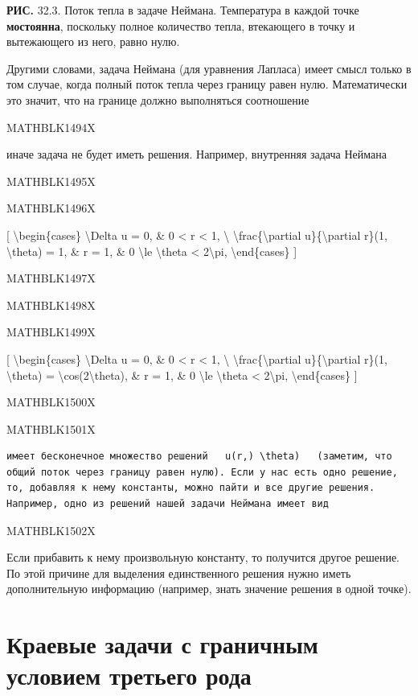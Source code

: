 \documentclass[
]{article}
\begin{document}
\textbf{РИС.} 32.3. Поток тепла в задаче Неймана. Температура в каждой
точке \textbf{мостоянна}, поскольку полное количество тепла, втекающего
в точку и вытежающего из него, равно нулю.

Другими словами, задача Неймана (для уравнения Лапласа) имеет смысл
только в том случае, когда полный поток тепла через границу равен нулю.
Математически это значит, что на границе должно выполняться соотношение

MATHBLK1494X

иначе задача не будет иметь решения. Например, внутренняя задача Неймана

MATHBLK1495X

MATHBLK1496X

{[} \textbackslash begin\{cases\} \textbackslash Delta u = 0, \& 0
\textless{} r \textless{} 1, \textbackslash{}
\textbackslash frac\{\textbackslash partial u\}\{\textbackslash partial
r\}(1, \textbackslash theta) = 1, \& r = 1, \& 0 \textbackslash le
\textbackslash theta \textless{} 2\textbackslash pi,
\textbackslash end\{cases\} {]}

MATHBLK1497X

MATHBLK1498X

MATHBLK1499X

{[} \textbackslash begin\{cases\} \textbackslash Delta u = 0, \& 0
\textless{} r \textless{} 1, \textbackslash{}
\textbackslash frac\{\textbackslash partial u\}\{\textbackslash partial
r\}(1, \textbackslash theta) =
\textbackslash cos(2\textbackslash theta), \& r = 1, \& 0
\textbackslash le \textbackslash theta \textless{} 2\textbackslash pi,
\textbackslash end\{cases\} {]}

MATHBLK1500X

MATHBLK1501X

\begin{verbatim}
имеет бесконечное множество решений   u(r,) \theta)   (заметим, что общий поток через границу равен нулю). Если у нас есть одно решение, то, добавляя к нему константы, можно пайти и все другие решения. Например, одно из решений нашей задачи Неймана имеет вид
\end{verbatim}

MATHBLK1502X

Если прибавить к нему произвольную константу, то получится другое
решение. По этой причине для выделения единственного решения нужно иметь
дополнительную информацию (например, знать значение решения в одной
точке).

\section{\texorpdfstring{\textbf{Краевые задачи с граничным условием}
третьего
рода}{Краевые задачи с граничным условием третьего рода}}\label{ux43aux440ux430ux435ux432ux44bux435-ux437ux430ux434ux430ux447ux438-ux441-ux433ux440ux430ux43dux438ux447ux43dux44bux43c-ux443ux441ux43bux43eux432ux438ux435ux43c-ux442ux440ux435ux442ux44cux435ux433ux43e-ux440ux43eux434ux430}
\end{document}
